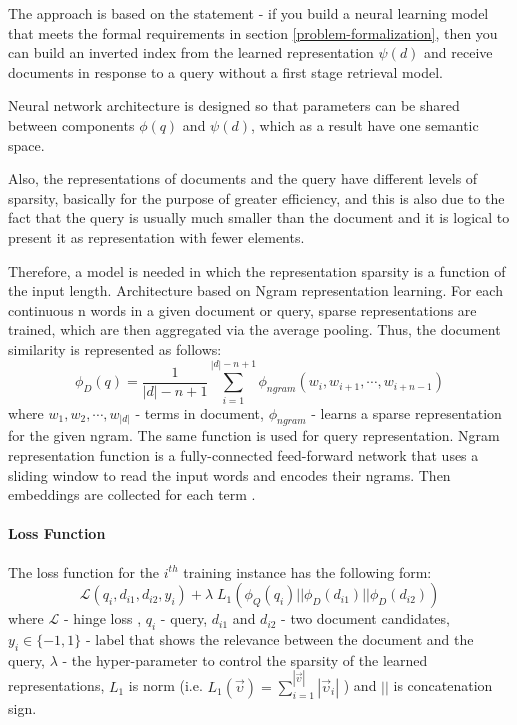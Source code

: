 \documentclass[
    twocolumn,
]{ceurart}
\begin{document}
    The approach is based on the statement - if you build a neural learning model that meets the
    formal requirements in section \ref{problem-formalization}, then you can build an inverted
    index from the learned representation $\psi(d)$ and receive documents in response to a query
    without a first stage retrieval model.

    Neural network architecture is designed so that parameters can be shared between components
    $\phi(q)$ and $\psi(d)$, which as a result have one semantic space.

    Also, the representations of documents and the query have different levels of sparsity,
    basically for the purpose of greater efficiency, and this is also due to the fact that
    the query is usually much smaller than the document and it is logical to present it as
    representation with fewer elements.

    Therefore, a model is needed in which the representation sparsity is a function
    of the input length.
    Architecture based on Ngram representation learning.
    For each continuous n words in a given document or query, sparse representations are trained,
    which are then aggregated via the average pooling.
    Thus, the document similarity is represented as follows:
    \begin{equation}
        \phi_D(q)=\frac{1}{|d| - n + 1} \sum_{i=1}^{|d| - n + 1} \phi_{ngram}(w_i, w_{i+1}, \cdots, w_{i+n-1})
    \end{equation}
    where $w_1, w_2, \cdots, w_{|d|}$ - terms in document, $\phi_{ngram}$ - learns a sparse representation
    for the given ngram.
    The same function is used for query representation.
    Ngram representation function is a fully-connected feed-forward network that uses a sliding
    window to read the input words and encodes their ngrams.
    Then embeddings are collected for each term \cite{SNRM}.

    \paragraph{Loss Function}
    The loss function for the $i^{th}$ training instance has the following form:
    \begin{equation}
        \mathcal{L}(q_i,d_{i1},d_{i2},y_i) + \lambda\;L_1(\phi_Q(q_i)||\phi_D(d_{i1})||\phi_D(d_{i2}))
    \end{equation}
    where $\mathcal{L}$ - hinge loss \cite{IRNLP}, $q_i$ - query, $d_{i1}$ and $d_{i2}$ - two
    document candidates, $y_i \in \{-1, 1\}$ - label that shows the relevance between the document
    and the query, $\lambda$ - the hyper-parameter to control the sparsity of the learned
    representations, $L_1$ is norm (i.e.
    \begin{math}
        L_1(\vec{\upsilon}) = \sum_{i=1}^{|\vec{\upsilon}|}|\vec{\upsilon}_i|
    \end{math}
    ) and $||$ is concatenation sign.\\\par
\end{document}
